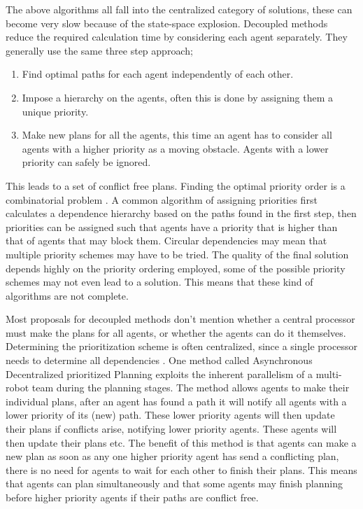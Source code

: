 \documentclass[a4paper]{article}
\begin{document}
The above algorithms all fall into the centralized category of solutions, these
can become very slow because of the state-space explosion. Decoupled methods
reduce the required calculation time by considering each agent separately. They
generally use the same three step approach;
\begin{enumerate}
	\item Find optimal paths for each agent independently of each other.
	\item Impose a hierarchy on the agents, often this is done by assigning
	them a unique priority.
	\item Make new plans for all the agents, this time an agent has to consider
	all agents with a higher priority as a moving obstacle. Agents with a lower
	priority can safely be ignored.
\end{enumerate}
This leads to a set of conflict free plans. Finding the optimal priority order
is a combinatorial problem
\cite{bennewitz2002}. A common algorithm of assigning priorities first
calculates a dependence hierarchy based on the paths found in the first step,
then priorities can be assigned such that agents have a priority that is higher
than that of agents that may block them. Circular dependencies may mean that
multiple priority schemes may have to be tried. The quality of the final
solution depends highly on the priority ordering employed, some of the possible
priority schemes may not even lead to a solution. This means that these kind of
algorithms are not complete.

Most proposals for decoupled methods don't mention whether a central processor
must make the plans for all agents, or whether the agents can do it themselves.
Determining the prioritization scheme is often centralized, since a
single processor needs to determine all dependencies \cite{bennewitz2002}. One
method called Asynchronous Decentralized prioritized Planning \cite{cap2012}
exploits the inherent parallelism of a multi-robot team during the planning
stages. The method allows
agents to make their individual plans, after an agent has found a path it will
notify all agents with a lower priority of its (new) path. These lower priority
agents will then update their plans if conflicts arise, notifying lower
priority agents. These agents will then update their plans etc. The benefit of
this method is that agents can make a new plan as soon as any one higher
priority agent has send a conflicting plan, there is no need for agents to
wait for each other to finish their plans. This means that agents can plan
simultaneously and that some agents may finish planning before higher priority
agents if their paths are conflict free.
\end{document}

